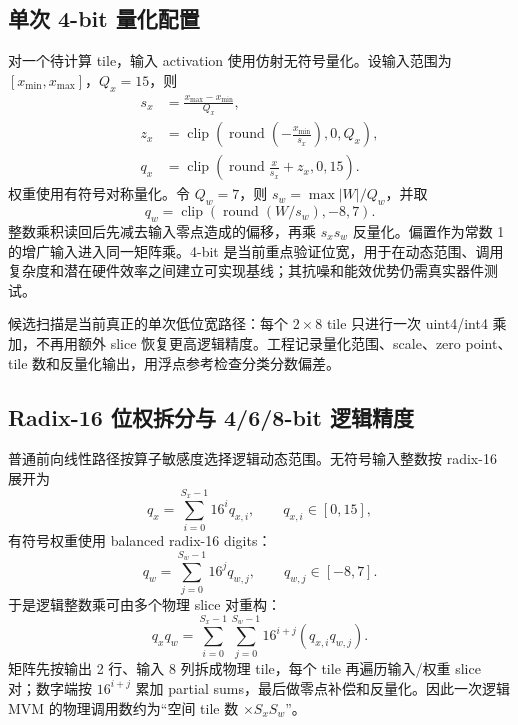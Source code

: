 \documentclass[
    TwoSide=false,
    Degree=graduate,
    GradLevel=master,
    Type=thesis,
    Title={光电混合运动想象脑机接口技术文档}
]{zjuthesis}
\begin{document}
\subsection{单次 4-bit 量化配置}
对一个待计算 tile，输入 activation 使用仿射无符号量化。设输入范围为 $[x_{\min},x_{\max}]$，$Q_x=15$，则
\begin{equation}\label{eq:quant}
\begin{aligned}
s_x&=\frac{x_{\max}-x_{\min}}{Q_x},\\
z_x&=\operatorname{clip}\left(\operatorname{round}\left(-\frac{x_{\min}}{s_x}\right),0,Q_x\right),\\
q_x&=\operatorname{clip}\left(\operatorname{round}\frac{x}{s_x}+z_x,0,15\right).
\end{aligned}
\end{equation}
权重使用有符号对称量化。令 $Q_w=7$，则 $s_w=\max|W|/Q_w$，并取
\begin{equation}
q_w=\operatorname{clip}\left(\operatorname{round}(W/s_w),-8,7\right).
\end{equation}
整数乘积读回后先减去输入零点造成的偏移，再乘 $s_xs_w$ 反量化。偏置作为常数 1 的增广输入进入同一矩阵乘。4-bit 是当前重点验证位宽，用于在动态范围、调用复杂度和潜在硬件效率之间建立可实现基线；其抗噪和能效优势仍需真实器件测试。

候选扫描是当前真正的单次低位宽路径：每个 $2\times8$ tile 只进行一次 uint4/int4 乘加，不再用额外 slice 恢复更高逻辑精度。工程记录量化范围、scale、zero point、tile 数和反量化输出，用浮点参考检查分类分数偏差。

\subsection{Radix-16 位权拆分与 4/6/8-bit 逻辑精度}
普通前向线性路径按算子敏感度选择逻辑动态范围。无符号输入整数按 radix-16 展开为
\begin{equation}
q_x=\sum_{i=0}^{S_x-1}16^i q_{x,i},\qquad q_{x,i}\in[0,15],
\end{equation}
有符号权重使用 balanced radix-16 digits：
\begin{equation}
q_w=\sum_{j=0}^{S_w-1}16^j q_{w,j},\qquad q_{w,j}\in[-8,7].
\end{equation}
于是逻辑整数乘可由多个物理 slice 对重构：
\begin{equation}
q_xq_w=\sum_{i=0}^{S_x-1}\sum_{j=0}^{S_w-1}16^{i+j}\left(q_{x,i}q_{w,j}\right).
\end{equation}
矩阵先按输出 2 行、输入 8 列拆成物理 tile，每个 tile 再遍历输入/权重 slice 对；数字端按 $16^{i+j}$ 累加 partial sums，最后做零点补偿和反量化。因此一次逻辑 MVM 的物理调用数约为“空间 tile 数 $\times S_xS_w$”。
\end{document}
